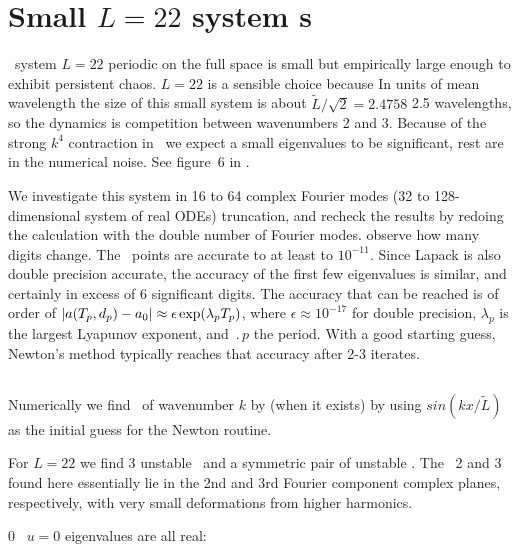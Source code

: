 %


\section{Small $L=22$ system {\rpo s}}
\label{s:L22}

\KS\ system $L = 22$ periodic on the full space is small but empirically 
large enough to exhibit persistent chaos.  $L=22$ is a sensible choice 
because In units of mean wavelength the size of this small system is about 
$ \tilde{L}/\sqrt{2}= 2.4758$ 2.5 wavelengths, so the dynamics is 
competition between wavenumbers 2 and 3. Because of the strong $k^4$ 
contraction in \KS\ we expect a small eigenvalues to be significant, rest 
are in the numerical noise. See figure~6 in .

 We investigate this system in 16 to 64 complex Fourier modes (32 to 
128-dimensional system of real ODEs) truncation, and recheck the results 
by redoing the calculation with the double number of Fourier modes. %
observe how many digits change. The \eqv\ points are accurate to at least 
to $10^{-11}$. Since Lapack is also double precision accurate, the 
accuracy of the first few eigenvalues is similar, and certainly in excess 
of 6 significant digits. %
The accuracy that can be reached is of order of 
$|a({T_{p}},d_p) - a_0| 
 \approx \epsilon \exp(\lambda_p {T_{p}})$, 
 where $\epsilon \approx 10^{-17}$ for double precision, $\lambda_p$ is 
the largest Lyapunov exponent, and $\period{p}$ the period.  With a good 
starting guess, Newton's method typically reaches that accuracy after 2-3 
iterates.

\subsection{\Eqva}

Numerically we find \eqv\ of wavenumber $k$ by (when it exists)
by using $sin( k x /\tilde{L})$ as the initial guess for the Newton routine.

For $L = 22$ we find
3 unstable \eqva\ and a symmetric pair of unstable \reqva.
The \eqva\ {\nameit}2 and {\nameit}3 found here
essentially lie in the 2nd and 3rd Fourier component complex planes,
respectively, with very
small deformations from higher harmonics.

{\nameit}0 \eqv\  $u=0$ eigenvalues are all real:

